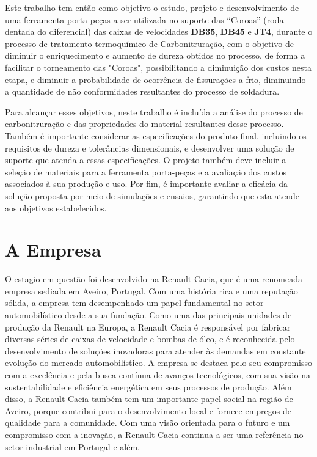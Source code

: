 Este trabalho tem então como objetivo o estudo, projeto e desenvolvimento de uma ferramenta porta-peças a ser utilizada no suporte das “Coroas” (roda dentada do diferencial) das caixas de velocidades \textbf{DB35}, \textbf{DB45} e \textbf{JT4}, durante o processo de tratamento termoquímico de Carbonitruração, com o objetivo de diminuir o enriquecimento e aumento de dureza obtidos no processo, de forma a facilitar o torneamento das "Coroas", possibilitando a diminuição dos custos nesta etapa, e diminuir a probabilidade de ocorrência de fissurações a frio, diminuindo a quantidade de não conformidades resultantes do processo de soldadura.
\par
\newpage
Para alcançar esses objetivos, neste trabalho é incluída a análise do processo de carbonitruração e das propriedades do material resultantes desse processo. Também é importante considerar as especificações do produto final, incluindo os requisitos de dureza e tolerâncias dimensionais, e desenvolver uma solução de suporte que atenda a essas especificações. O projeto também deve incluir a seleção de materiais para a ferramenta porta-peças e a avaliação dos custos associados à sua produção e uso. Por fim, é importante avaliar a eficácia da solução proposta por meio de simulações e ensaios, garantindo que esta atende aos objetivos estabelecidos.
\section{A Empresa} \label{s:intro_empresa}
O estagio em questão foi desenvolvido na Renault Cacia, que é uma renomeada empresa sediada em Aveiro, Portugal. Com uma história rica e uma reputação sólida, a empresa tem desempenhado um papel fundamental no setor automobilístico desde a sua fundação. Como uma das principais unidades de produção da Renault na Europa, a Renault Cacia é responsável por fabricar diversas séries de caixas de velocidade e bombas de óleo, e é reconhecida pelo desenvolvimento de soluções inovadoras para atender às demandas em constante evolução do mercado automobilístico. A empresa se destaca pelo seu compromisso com a excelência e pela busca contínua de avanços tecnológicos, com sua visão na sustentabilidade e eficiência energética em seus processos de produção. Além disso, a Renault Cacia também tem um importante papel social na região de Aveiro, porque contribui para o desenvolvimento local e fornece empregos de qualidade para a comunidade. Com uma visão orientada para o futuro e um compromisso com a inovação, a Renault Cacia continua a ser uma referência no setor industrial em Portugal e além.

